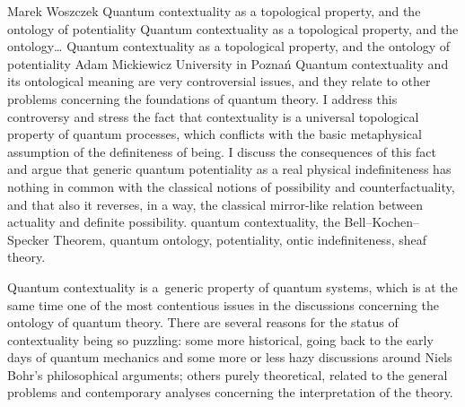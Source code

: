 \begin{artengenv}{Marek Woszczek}
	{Quantum contextuality as a topological property, and the ontology of potentiality}
	{Quantum contextuality as a topological property, and the ontology\ldots}
	{Quantum contextuality as a topological property, and the ontology of potentiality}
	{Adam Mickiewicz University in Poznań}
	{Quantum contextuality and its ontological meaning are very controversial issues, and they relate to other problems concerning the foundations of quantum theory. I address this controversy and stress the fact that contextuality is a universal topological property of quantum processes, which conflicts with the basic metaphysical assumption of the definiteness of being. I discuss the consequences of this fact and argue that generic quantum potentiality as a real physical indefiniteness has nothing in common with the classical notions of possibility and counterfactuality, and that also it reverses, in a way, the classical mirror-like relation between actuality and definite possibility.}
	{quantum contextuality, the Bell–Kochen–Specker Theorem, quantum ontology, potentiality, ontic indefiniteness, sheaf theory.}



\lettrine[loversize=0.13,lines=2,lraise=-0.03,nindent=0em,findent=0.2pt]%
{Q}{}uantum contextuality is a~generic property of quantum systems, which is at the same time one of the most contentious issues in the discussions concerning the ontology of quantum theory. There are several reasons for the status of contextuality being so puzzling: some more historical, going back to the early days of quantum mechanics and some more or less hazy discussions around Niels Bohr's philosophical arguments; others purely theoretical, related to the general problems and contemporary analyses concerning the interpretation of the theory.


\end{artengenv}
